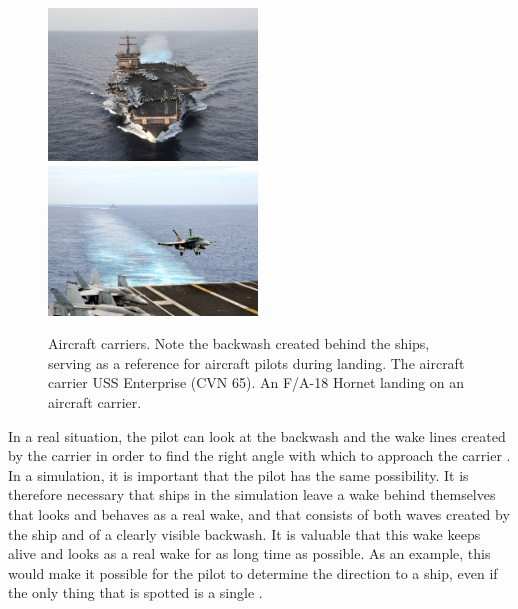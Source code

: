 \begin{figure}
    \centering
    \subcaptionbox{\label{fig:aircraft_carrier_full_wake}} {\includegraphics[width=0.495\textwidth]{Images/Public_domain/The_aircraft_carrier_USS_Enterprise_(CVN_65)}}
    \subcaptionbox{\label{fig:aircraft_carrier_landing_backwash}} {\includegraphics[width=0.495\textwidth]{Images/Public_domain/An_F-A-18C_Hornet_lands_on_the_aircraft_carrier_USS_George_Washington_(CVN_73)}}
    \caption{Aircraft carriers. Note the backwash created behind the ships, serving as a reference for aircraft pilots during landing.  The aircraft carrier USS Enterprise (CVN 65).  An F/A-18 Hornet landing on an aircraft carrier.}
    \label{fig:aircraft_carriers_and_backwash}
\end{figure}

In a real situation, the pilot can look at the backwash and the wake lines created by the carrier in order to find the right angle with which to approach the carrier \citep[can be seen in][see also ]{Alivewithpassion2007,MatteoBram2007}. In a simulation, it is important that the pilot has the same possibility. It is therefore necessary that ships in the simulation leave a wake behind themselves that looks and behaves as a real wake, and that consists of both waves created by the ship and of a clearly visible backwash. It is valuable that this wake keeps alive and looks as a real wake for as long time as possible. As an example, this would make it possible for the pilot to determine the direction to a ship, even if the only thing that is spotted is a single .
